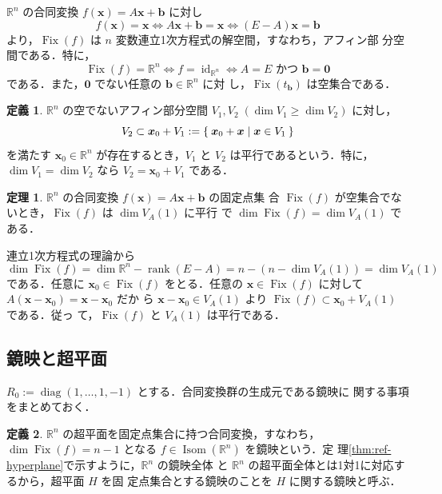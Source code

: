 \documentclass[11pt, uplatex, dvipdfmx, titlepage]{jsarticle}
\makeatletter
\DeclareMathOperator{\Isom}{Isom}
\DeclareMathOperator{\Fix}{Fix}
\DeclareMathOperator{\id}{id}
\DeclareMathOperator{\rank}{rank}
\DeclareMathOperator{\diag}{diag}
\renewenvironment{proof}[1][\proofname]{\par
  \pushQED{\qed}%
  \normalfont \topsep6\p@\@plus6\p@\relax
  \trivlist
  \item[\hskip\labelsep
         \bfseries
    {#1}]\ignorespaces
}{%
  \popQED\endtrivlist\@endpefalse
}
\theoremstyle{definition}
\newtheorem{theorem}{定理}[section]
\newtheorem*{definition}{定義}
\renewcommand{\proofname}{\textbf{証明}}
\makeatother
\begin{document}
$\mathbb{R}^n$ の合同変換 $f(\bm{x}) = A\bm{x}+\bm{b}$ に対し
\[
  f(\bm{x}) = \bm{x} \Leftrightarrow A\bm{x}+\bm{b} = \bm{x} \Leftrightarrow (E-A)\bm{x} = \bm{b}
\]
より，$\Fix(f)$ は $n$ 変数連立1次方程式の解空間，すなわち，アフィン部
分空間である．特に，
\[
  \Fix(f) = \mathbb{R}^n \Leftrightarrow f = \id_{\mathbb{R}^n} \Leftrightarrow 
  A=E \text{ かつ }\bm{b}=\bm{0}
\]
である．また，$\bm{0}$ でない任意の $\bm{b} \in \mathbb{R}^n$ に対
し，$\Fix \left (t_{\bm{b}} \right)$ は空集合である．

\begin{definition}
  $\mathbb{R}^n$ の空でないアフィン部分空間 $V_1, V_2 \; (\dim V_1 \geq \dim V_2)$ に対し，
  \[
    V_2 \subset \bm{x}_0 + V_1 := \Set{ \bm{x}_0 + \bm{x} | \bm{x} \in V_1}
  \]
  を満たす $\bm{x}_0 \in \mathbb{R}^n$ が存在するとき，$V_1$ と $V_2$
  は平行であるという．特に，$\dim V_1 = \dim V_2$ なら $V_2 = \bm{x}_0
  +V_1$ である．
\end{definition}


\begin{theorem}\label{thm:diminv}
  $\mathbb{R}^n$ の合同変換 $f(\bm{x}) = A\bm{x} + \bm{b}$ の固定点集
  合 $\Fix(f)$ が空集合でないとき，$\Fix(f)$ は $\dim V_A(1)$ に平行
  で $\dim \Fix(f) = \dim V_A(1)$ である．
\end{theorem}

\begin{proof}
  連立1次方程式の理論から
  \[
    \dim \Fix(f) = \dim \mathbb{R}^n  - \rank(E-A) = n - \left( n - \dim V_A(1)\right) = \dim V_A(1)
  \]
  である．任意に $\bm{x}_0 \in \Fix(f)$ をとる．任意の $\bm{x} \in
  \Fix(f)$ に対して $A(\bm{x} - \bm{x}_0) = \bm{x} -\bm{x}_0$ だか
  ら $\bm{x} - \bm{x}_0 \in V_A(1)$ より
  $\Fix(f) \subset \bm{x}_0 + V_A(1)$ である．従っ
  て，$\Fix(f)$ と $V_A(1)$ は平行である．
\end{proof}

\subsection{鏡映と超平面}\label{sec:reflection}

$R_0 := \diag(1, \ldots, 1, -1)$ とする．合同変換群の生成元である鏡映に
関する事項をまとめておく．

\begin{definition}
  $\mathbb{R}^n$ の超平面を固定点集合に持つ合同変換，すなわち，$\dim
  \Fix(f)=n-1$ となる $f \in \Isom(\mathbb{R}^n)$ を鏡映という．定
  理\ref{thm:ref-hyperplane}で示すように，$\mathbb{R}^n$ の鏡映全体
  と $\mathbb{R}^n$ の超平面全体とは1対1に対応するから，超平面 $H$ を固
  定点集合とする鏡映のことを $H$ に関する鏡映と呼ぶ．

\end{definition}
\end{document}

